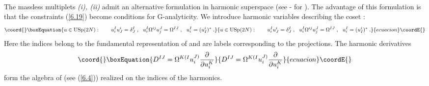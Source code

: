\documentclass[a4paper,12pt]{article}
\begin{document}
The massless multiplets {\sl (i), (ii)} admit an alternative 
formulation in harmonic superspace (see \cite{HStT}-\cite{Howe} 
for \coordHE{}). The advantage of this formulation is that the 
constraints (\ref{6.19}) become conditions for G-analyticity. We 
introduce harmonic variables describing the coset 
\coordHE{}: 
\begin{equation}\coord{}\boxEquation{\label{6.25}
  u\in \mbox{USp}(2N): \qquad u^I_iu^i_J = \delta^I_J\;, 
\ \ u^I_i \Omega^{ij}u^J_j = \Omega^{IJ}\;, \ \  u^I_i= 
(u^i_I)^*\;. 
}{u\in \mbox{USp}(2N): \qquad u^I_iu^i_J = \delta^I_J\;, 
\ \ u^I_i \Omega^{ij}u^J_j = \Omega^{IJ}\;, \ \  u^I_i= 
(u^i_I)^*\;. 
}{ecuacion}\coordE{}\end{equation}
Here the indices \coordHE{} belong to the fundamental representation of  
\coordHE{} and \coordHE{} are labels corresponding to the 
\coordHE{} projections. The harmonic derivatives  
\begin{equation}\coord{}\boxEquation{\label{6.26}
  D^{IJ} = \Omega^{K(I}u^{J)}_i{\partial\over\partial u^K_i}
}{D^{IJ} = \Omega^{K(I}u^{J)}_i{\partial\over\partial u^K_i}
}{ecuacion}\coordE{}\end{equation}
form the algebra of \coordHE{} (see (\ref{6.4})) realized 
on the indices \coordHE{} of the harmonics. 
\end{document}
